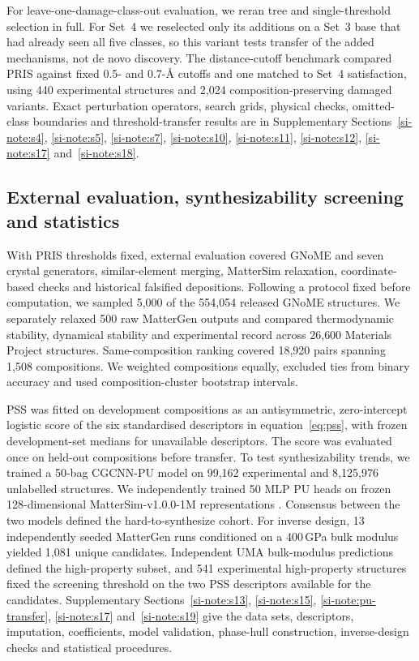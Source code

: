 For leave-one-damage-class-out evaluation, we reran tree and single-threshold selection
in full. For Set~4 we reselected only its additions on a Set~3 base that had already seen all five
classes, so this variant tests transfer of the added mechanisms, not de novo discovery. The distance-cutoff benchmark compared PRIS against fixed 0.5- and 0.7-\AA{}
cutoffs and one matched to Set~4 satisfaction, using 440 experimental structures
and 2{,}024 composition-preserving damaged variants. Exact perturbation operators,
search grids, physical checks, omitted-class boundaries and threshold-transfer results
are in Supplementary Sections~\ref{si-note:s4}, \ref{si-note:s5}, \ref{si-note:s7},
\ref{si-note:s10}, \ref{si-note:s11}, \ref{si-note:s12}, \ref{si-note:s17}
and~\ref{si-note:s18}.

\subsection{External evaluation, synthesizability screening and statistics}

With PRIS thresholds fixed, external evaluation covered GNoME and seven crystal generators,
similar-element merging, MatterSim relaxation, coordinate-based checks and historical
falsified depositions. Following a protocol fixed before computation, we sampled 5{,}000 of the 554{,}054
released GNoME structures. We separately relaxed 500 raw MatterGen outputs and compared
thermodynamic stability, dynamical stability and experimental record across 26{,}600
Materials Project structures. Same-composition ranking covered 18{,}920 pairs spanning
1{,}508 compositions. We weighted compositions equally, excluded ties from binary accuracy
and used composition-cluster bootstrap intervals.

PSS was fitted on development compositions as an antisymmetric, zero-intercept logistic
score of the six standardised descriptors in equation~\ref{eq:pss}, with frozen
development-set medians for unavailable descriptors. The score was evaluated once on
held-out compositions before transfer. To test synthesizability trends, we trained a 50-bag CGCNN-PU model on
99{,}162 experimental and 8{,}125{,}976 unlabelled structures. We independently trained 50 MLP PU
heads on frozen 128-dimensional MatterSim-v1.0.0-1M representations
\cite{jang2020structure,song2025llm,yang2024mattersim}. Consensus between the two models defined the
hard-to-synthesize cohort. For inverse design, 13 independently seeded MatterGen runs
conditioned on a 400\,GPa bulk modulus yielded 1{,}081 unique candidates. Independent UMA
bulk-modulus predictions defined the high-property subset, and 541 experimental
high-property structures fixed the screening threshold on the two PSS descriptors available
for the candidates. Supplementary
Sections~\ref{si-note:s13}, \ref{si-note:s15}, \ref{si-note:pu-transfer},
\ref{si-note:s17} and~\ref{si-note:s19} give the data sets, descriptors, imputation,
coefficients, model validation, phase-hull construction, inverse-design checks and
statistical procedures.
